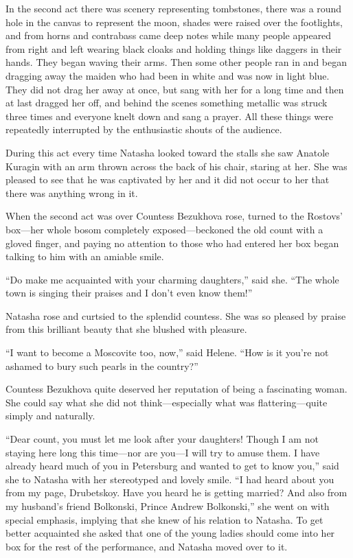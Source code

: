 In the second act there was scenery representing tombstones,
there was a round hole in the canvas to represent the moon,
shades were raised over the footlights, and from horns and
contrabass came deep notes while many people appeared from right
and left wearing black cloaks and holding things like daggers in
their hands. They began waving their arms. Then some other people
ran in and began dragging away the maiden who had been in white
and was now in light blue. They did not drag her away at once,
but sang with her for a long time and then at last dragged her
off, and behind the scenes something metallic was struck three
times and everyone knelt down and sang a prayer. All these things
were repeatedly interrupted by the enthusiastic shouts of the
audience.

During this act every time Natasha looked toward the stalls she
saw Anatole Kuragin with an arm thrown across the back of his
chair, staring at her. She was pleased to see that he was
captivated by her and it did not occur to her that there was
anything wrong in it.

When the second act was over Countess Bezukhova rose, turned to
the Rostovs' box---her whole bosom completely exposed---beckoned
the old count with a gloved finger, and paying no attention to
those who had entered her box began talking to him with an
amiable smile.

``Do make me acquainted with your charming daughters,'' said
she. ``The whole town is singing their praises and I don't even
know them!''

Natasha rose and curtsied to the splendid countess. She was so
pleased by praise from this brilliant beauty that she blushed
with pleasure.

``I want to become a Moscovite too, now,'' said Helene. ``How is
it you're not ashamed to bury such pearls in the country?''

Countess Bezukhova quite deserved her reputation of being a
fascinating woman. She could say what she did not
think---especially what was flattering---quite simply and
naturally.

``Dear count, you must let me look after your daughters! Though I
am not staying here long this time---nor are you---I will try to
amuse them. I have already heard much of you in Petersburg and
wanted to get to know you,'' said she to Natasha with her
stereotyped and lovely smile. ``I had heard about you from my
page, Drubetskoy. Have you heard he is getting married? And also
from my husband's friend Bolkonski, Prince Andrew Bolkonski,''
she went on with special emphasis, implying that she knew of his
relation to Natasha. To get better acquainted she asked that one
of the young ladies should come into her box for the rest of the
performance, and Natasha moved over to it.


